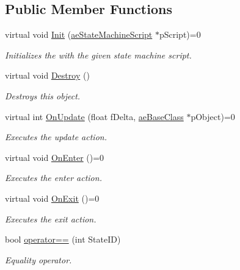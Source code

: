 \subsection*{Public Member Functions}
\begin{DoxyCompactItemize}
\item 
virtual void \hyperlink{class_c_state_a220fab97e545680a7237dbb0d04ba037}{Init} (\hyperlink{classae_state_machine_script}{ae\+State\+Machine\+Script} $\ast$p\+Script)=0
\begin{DoxyCompactList}\small\item\em Initializes the with the given state machine script. \end{DoxyCompactList}\item 
virtual void \hyperlink{class_c_state_ab51ebc6c91699f2b1a3b49e77fba9ebf}{Destroy} ()\hypertarget{class_c_state_ab51ebc6c91699f2b1a3b49e77fba9ebf}{}\label{class_c_state_ab51ebc6c91699f2b1a3b49e77fba9ebf}

\begin{DoxyCompactList}\small\item\em Destroys this object. \end{DoxyCompactList}\item 
virtual int \hyperlink{class_c_state_a9d687e06b17b821703332fa3d4ea8bcf}{On\+Update} (float f\+Delta, \hyperlink{classae_base_class}{ae\+Base\+Class} $\ast$p\+Object)=0
\begin{DoxyCompactList}\small\item\em Executes the update action. \end{DoxyCompactList}\item 
virtual void \hyperlink{class_c_state_aa243e28819ea28e4499a37ce88905f5a}{On\+Enter} ()=0\hypertarget{class_c_state_aa243e28819ea28e4499a37ce88905f5a}{}\label{class_c_state_aa243e28819ea28e4499a37ce88905f5a}

\begin{DoxyCompactList}\small\item\em Executes the enter action. \end{DoxyCompactList}\item 
virtual void \hyperlink{class_c_state_ad44fb6c87328ce8429f0a11fcb1546c9}{On\+Exit} ()=0\hypertarget{class_c_state_ad44fb6c87328ce8429f0a11fcb1546c9}{}\label{class_c_state_ad44fb6c87328ce8429f0a11fcb1546c9}

\begin{DoxyCompactList}\small\item\em Executes the exit action. \end{DoxyCompactList}\item 
bool \hyperlink{class_c_state_ab3ac73ec432c327da36cdaaabeb2ac76}{operator==} (int State\+ID)
\begin{DoxyCompactList}\small\item\em Equality operator. \end{DoxyCompactList}\end{DoxyCompactItemize}
